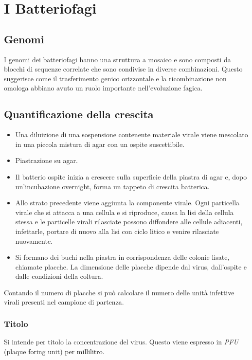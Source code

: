 \section{I Batteriofagi}
	
	\subsection{Genomi}
	I genomi dei batteriofagi hanno una struttura a mosaico e sono composti da blocchi di sequenze correlate che sono condivise in diverse combinazioni. 
	Questo suggerisce come il trasferimento genico orizzontale e la ricombinazione non omologa abbiano avuto un ruolo importante nell'evoluzione fagica.
	\subsection{Quantificazione della crescita}
	\begin{multicols}{2}
		\begin{itemize}
    			\item Una diluizione di una sospensione contenente materiale virale viene mescolato in una piccola mistura di agar con un ospite suscettibile. 
			\item Piastrazione su agar.
    			\item Il batterio ospite inizia a crescere sulla superficie della piastra di agar e, dopo un'incubazione overnight, forma un tappeto di crescita batterica.
    			\item Allo strato precedente viene aggiunta la componente virale.
				Ogni particella virale che si attacca a una cellula e si riproduce, causa la lisi della cellula stessa e le particelle virali rilasciate possono diffondere alle cellule adiacenti, infettarle, portare di nuovo alla lisi con ciclo litico e venire rilasciate nuovamente.
    			\item Si formano dei buchi nella piastra in corrispondenza delle colonie lisate, chiamate placche. 
				La dimensione delle placche dipende dal virus, dall'ospite e dalle condizioni della coltura.
		\end{itemize}
	\end{multicols}
	Contando il numero di placche si può calcolare il numero delle unità infettive virali presenti nel campione di partenza. 

		\subsubsection{Titolo}
		Si intende per titolo la concentrazione del virus.
		Questo viene espresso in \emph{PFU} (plaque foring unit) per millilitro.

